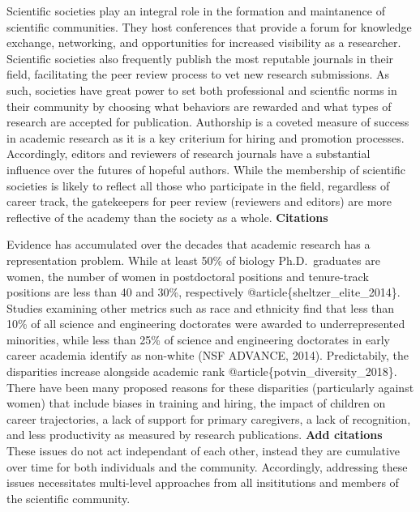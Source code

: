 \documentclass[11pt,]{article}
\begin{document}
Scientific societies play an integral role in the formation and
maintanence of scientific communities. They host conferences that
provide a forum for knowledge exchange, networking, and opportunities
for increased visibility as a researcher. Scientific societies also
frequently publish the most reputable journals in their field,
facilitating the peer review process to vet new research submissions. As
such, societies have great power to set both professional and scientfic
norms in their community by choosing what behaviors are rewarded and
what types of research are accepted for publication. Authorship is a
coveted measure of success in academic research as it is a key criterium
for hiring and promotion processes. Accordingly, editors and reviewers
of research journals have a substantial influence over the futures of
hopeful authors. While the membership of scientific societies is likely
to reflect all those who participate in the field, regardless of career
track, the gatekeepers for peer review (reviewers and editors) are more
reflective of the academy than the society as a whole.
\textbf{Citations}

Evidence has accumulated over the decades that academic research has a
representation problem. While at least 50\% of biology Ph.D.~graduates
are women, the number of women in postdoctoral positions and
tenure-track positions are less than 40 and 30\%, respectively
@article\{sheltzer\_elite\_2014\}. Studies examining other metrics such
as race and ethnicity find that less than 10\% of all science and
engineering doctorates were awarded to underrepresented minorities,
while less than 25\% of science and engineering doctorates in early
career academia identify as non-white (NSF ADVANCE, 2014). Predictabily,
the disparities increase alongside academic rank
@article\{potvin\_diversity\_2018\}. There have been many proposed
reasons for these disparities (particularly against women) that include
biases in training and hiring, the impact of children on career
trajectories, a lack of support for primary caregivers, a lack of
recognition, and less productivity as measured by research publications.
\textbf{Add citations} These issues do not act independant of each
other, instead they are cumulative over time for both individuals and
the community. Accordingly, addressing these issues necessitates
multi-level approaches from all insititutions and members of the
scientific community.
\end{document}
